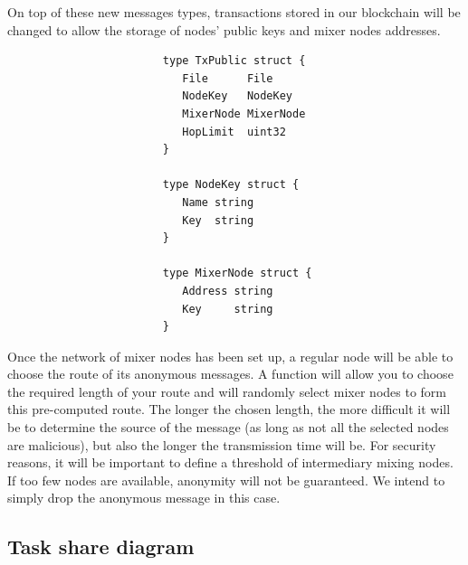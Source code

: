 \documentclass[11pt, a4paper]{article}
\begin{document}
            On top of these new messages types, transactions stored in our blockchain will be changed to allow the storage of nodes' public keys and mixer nodes addresses.
                \begin{lstlisting}
                        type TxPublic struct {
                           File      File
                           NodeKey   NodeKey
                           MixerNode MixerNode
                           HopLimit  uint32
                        }

                        type NodeKey struct {
                           Name string
                           Key  string
                        }

                        type MixerNode struct {
                           Address string
                           Key     string
                        }
                \end{lstlisting}

            Once the network of mixer nodes has been set up, a regular node will be able to choose the route of its anonymous messages.
            A function will allow you to choose the required length of your route and will randomly select mixer nodes to form this pre-computed route.
            The longer the chosen length, the more difficult it will be to determine the source of the message (as long as not all the selected nodes are malicious), but also the longer the transmission time will be.
            \bigbreak
            For security reasons, it will be important to define a threshold of intermediary mixing nodes.
            If too few nodes are available, anonymity will not be guaranteed.
            We intend to simply drop the anonymous message in this case.


    \subsection{Task share diagram}
\end{document}
